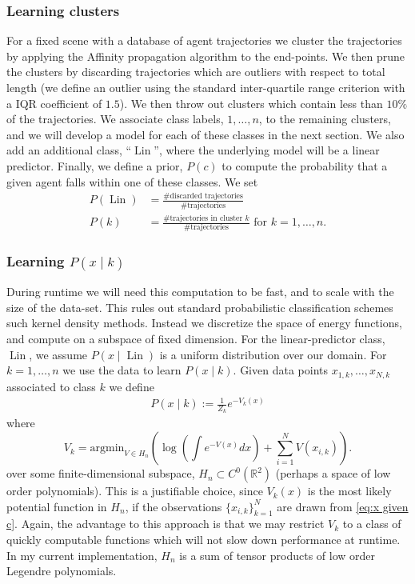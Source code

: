 \documentclass[12pt]{amsart}
\DeclareMathOperator{\Lin}{Lin}
\begin{document}
\subsubsection{Learning clusters}
For a fixed scene with a database of agent trajectories we cluster the trajectories by applying the Affinity propagation algorithm to the end-points.
We then prune the clusters by discarding trajectories which are outliers with respect to total length (we define an outlier using the standard inter-quartile range criterion with a IQR coefficient of $1.5$).
We then throw out clusters which contain less than $10\%$ of the trajectories.
We associate class labels, $1,\dots,n$,  to the remaining clusters, and we will develop a model for each of these classes in the next section.
We also add an additional class, ``$\Lin$'', where the underlying model will be a linear predictor.
Finally, we define a prior, $P(c)$ to compute the probability that a given agent falls within one of these classes.
We set 
\begin{align*}
	P(\Lin) &= \frac{ \text{\# discarded trajectories} }{ \text{ \# trajectories } } \\
	P(k) &= \frac{ \text{\# trajectories in cluster $k$} }{ \text{ \# trajectories } } \text{ for } k=1,\dots,n.
\end{align*}

\subsubsection{Learning $P(x \mid k)$ }
During runtime we will need this computation to be fast, and to scale with the size of the data-set.
This rules out standard probabilistic classification schemes such kernel density methods.
Instead we discretize the space of energy functions, and compute on a subspace of fixed dimension.
For the linear-predictor class, $\Lin$, we assume $P(x \mid \Lin )$ is a uniform distribution over our domain.
For $k = 1, \dots, n$ we use the data to learn $P(x \mid k)$.
Given data points $x_{1,k},\dots,x_{N,k}$ associated to class $k$ we define
\begin{align}
	P(x \mid k) := \frac{1}{Z_k } e^{-V_k(x) } \label{eq:x given c}
\end{align}
where
$$
	V_k =  \text{argmin}_{V \in H_n}  \left( \log \left( \int e^{ - V(x) } dx \right) + \sum_{i=1}^N V(x_{i,k} ) \right).
$$
over some finite-dimensional subspace, $H_n \subset C^0( \mathbb{R}^2)$ (perhaps a space of low order polynomials).
This is a justifiable choice, since $V_k(x)$ is the most likely potential function in $H_n$, if the observations $\{ x_{i,k}\}_{k=1}^N$ are drawn from \eqref{eq:x given c}.
Again, the advantage to this approach is that we may restrict $V_k$ to a class of quickly computable functions which will not slow down performance at runtime.
In my current implementation, $H_n$ is a sum of tensor products of low order Legendre polynomials.
\end{document}
